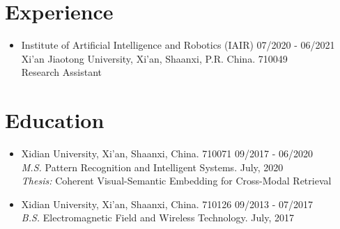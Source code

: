 \documentclass[10pt,margin,line,pifont,palatino,courier]{res}
\newenvironment{list1}{
  \begin{list}{\ding{113}}{%
      \setlength{\itemsep}{0in}
      \setlength{\parsep}{0in} \setlength{\parskip}{0in}
      \setlength{\topsep}{0in} \setlength{\partopsep}{0in}
      \setlength{\leftmargin}{0.17in}}}{\end{list}}
\newenvironment{list2}{
  \begin{list}{$\bullet$}{%
      \setlength{\itemsep}{0in}
      \setlength{\parsep}{0in} \setlength{\parskip}{0in}
      \setlength{\topsep}{0in} \setlength{\partopsep}{0in}
      \setlength{\leftmargin}{0.2in}}}{\end{list}}
\begin{document}
\begin{resume}
\section{\sc Experience}

\begin{itemize}[leftmargin=*]
	\item Institute of
		Artificial Intelligence and Robotics (IAIR) \hfill 07/2020 - 06/2021 \\
		Xi'an Jiaotong University, Xi'an, Shaanxi, P.R. China. 710049\\
		Research Assistant
\end{itemize}

\section{\sc Education}

\begin{itemize}[leftmargin=*]
\item Xidian University, Xi'an, Shaanxi, China. 710071 \hfill 09/2017 - 06/2020\\
	\textit{M.S.} Pattern Recognition and Intelligent Systems. July, 2020\\
	\textit{Thesis:} Coherent Visual-Semantic Embedding for Cross-Modal Retrieval
\item Xidian University, Xi'an, Shaanxi, China. 710126 \hfill 09/2013 - 07/2017\\
	\textit{B.S.} Electromagnetic Field and Wireless Technology. July, 2017
\end{itemize}

%
%
%


\end{resume}
\end{document}
